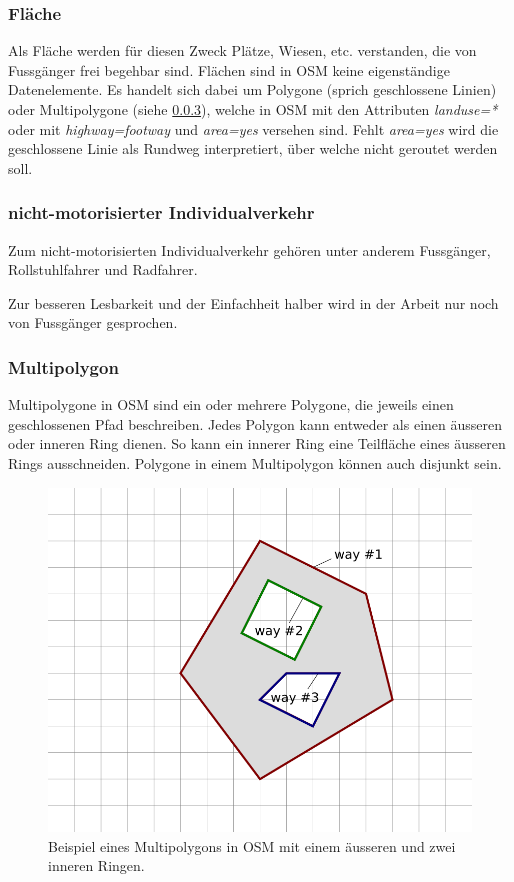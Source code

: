 \subsubsection{Fläche}
\label{Fläche}

Als Fläche werden für diesen Zweck Plätze, Wiesen, etc. verstanden, die von Fussgänger frei begehbar sind. Flächen sind in \ac{OSM} keine eigenständige Datenelemente. Es handelt sich dabei um Polygone (sprich geschlossene Linien) oder Multipolygone (siehe \ref{Multipolygon}), welche in \ac{OSM} mit den Attributen \textit{landuse=*} oder mit \textit{highway=footway} und \textit{area=yes} versehen sind. Fehlt \textit{area=yes} wird die geschlossene Linie als Rundweg interpretiert, über welche nicht geroutet werden soll. \cite{osm_wiki_area}

\subsubsection{nicht-motorisierter Individualverkehr}
\label{nicht-motorisierter Individualverkehr}

Zum nicht-motorisierten Individualverkehr gehören unter anderem Fussgänger, Rollstuhlfahrer und Radfahrer.

Zur besseren Lesbarkeit und der Einfachheit halber wird in der Arbeit nur noch von Fussgänger gesprochen.

\subsubsection{Multipolygon}
\label{Multipolygon}

Multipolygone in \ac{OSM} sind ein oder mehrere Polygone, die jeweils einen geschlossenen Pfad beschreiben. Jedes Polygon kann entweder als einen äusseren oder inneren Ring dienen. So kann ein innerer Ring eine Teilfläche eines äusseren Rings ausschneiden. Polygone in einem Multipolygon können auch disjunkt sein. \cite{osm_wiki_multipolygon}

\begin{figure}[th]
\centering
\includegraphics[width=0.5\linewidth]{technicalreport/img/multipolygon_osm_example.png}
\caption[Multipolygon OSM Example]{Beispiel eines Multipolygons in \ac{OSM} mit einem äusseren und zwei inneren Ringen. \cite{osm_wiki_multipolygon}}
\label{fig:multipolygon_osm_example}
\end{figure}

